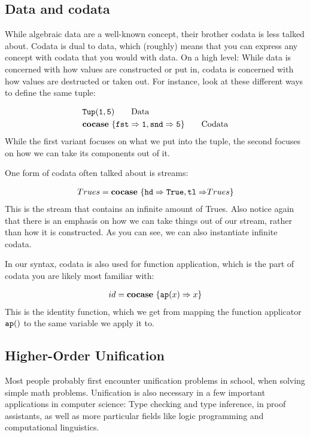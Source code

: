 \documentclass[twoside,12pt,a4paper]{article}
\begin{document}
\subsection{Data and codata}
While algebraic data are a well-known concept, their brother codata is less talked about. 
Codata is dual to data, which (roughly) means that you can express any concept with codata that you would with data.
On a high level: While data is concerned with how values are constructed or put in, codata is concerned with how values are destructed or taken out. 
For instance, look at these different ways to define the same tuple: 

\begin{example}
    \begin{align*}
        &\mathtt{Tup(}\mathtt{1,5}\mathtt{)} \tag*{Data}\\
        &\textbf{cocase}\ \{\mathtt{fst \Rightarrow 1}, \mathtt{snd \Rightarrow 5}\} \tag*{Codata}
    \end{align*}     
    While the first variant focuses on what we put into the tuple, the second focuses on how we can take its components out of it.   
\end{example}

One form of codata often talked about is streams:
\begin{example}[Streams]
    \begin{align*}
        Trues = \textbf{cocase}\ \{\mathtt{hd \Rightarrow True, tl \Rightarrow} Trues\}
    \end{align*}
    This is the stream that contains an infinite amount of Trues.
    Also notice again that there is an emphasis on how we can take things out of our stream, rather than how it is constructed.
    As you can see, we can also instantiate infinite codata. 
\end{example}
In our syntax, codata is also used for function application, 
which is the part of codata you are likely most familiar with:

\begin{example}
    \begin{align*}
        id = \textbf{cocase}\ \{\texttt{ap}(x)\Rightarrow x\}
    \end{align*}
    This is the identity function, which we get from mapping the function applicator $\texttt{ap}()$ to the same variable we apply it to.
\end{example}
    
\subsection{Higher-Order Unification}
Most people probably first encounter unification problems in school, when solving simple math problems.
Unification is also necessary in a few important applications in computer science: 
Type checking and type inference, in proof assistants, as well as more particular fields like logic programming and computational linguistics.
\end{document}
